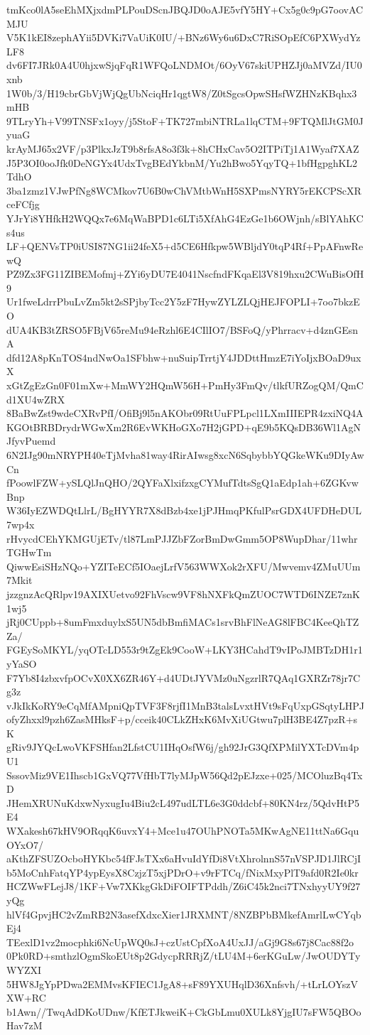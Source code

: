 tmKco0lA5seEhMXjxdmPLPouDScnJBQJD0oAJE5vfY5HY+Cx5g0c9pG7oovACMJU
V5K1kEI8zephAYii5DVKi7VaUiK0IU/+BNz6Wy6u6DxC7RiSOpEfC6PXWydYzLF8
dv6FI7JRk0A4U0hjxwSjqFqR1WFQoLNDMOt/6OyV67skiUPHZJj0aMVZd/IU0xnb
1W0b/3/H19cbrGbVjWjQgUbNciqHr1qgtW8/Z0tSgcsOpwSHsfWZHNzKBqhx3mHB
9TLryYh+V99TNSFx1oyy/j5StoF+TK727mbiNTRLa1lqCTM+9FTQMlJtGM0JyuaG
krAyMJ65x2VF/p3PlkxJzT9b8rfsA8o3f3k+8hCHxCav5O2ITPiTj1A1Wyaf7XAZ
J5P3OI0ooJfk0DeNGYx4UdxTvgBEdYkbnM/Yu2hBwo5YqyTQ+1bfHgpghKL2TdhO
3ba1zmz1VJwPfNg8WCMkov7U6B0wChVMtbWnH5SXPmsNYRY5rEKCPScXRceFCfjg
YJrYi8YHfkH2WQQx7e6MqWaBPD1c6LTi5XfAhG4EzGe1b6OWjnh/sBlYAhKCs4us
LF+QENVsTP0iUSI87NG1ii24feX5+d5CE6Hfkpw5WBljdY0tqP4Rf+PpAFnwRewQ
PZ9Zx3FG11ZIBEMofmj+ZYi6yDU7E4041NscfndFKqaEl3V819hxu2CWuBisOfH9
Ur1fweLdrrPbuLvZm5kt2sSPjbyTcc2Y5zF7HywZYLZLQjHEJFOPLI+7oo7bkzEO
dUA4KB3tZRSO5FBjV65reMu94eRzhl6E4CIlIO7/BSFoQ/yPhrracv+d4znGEsnA
dfd12A8pKnTOS4ndNwOa1SFbhw+nuSuipTrrtjY4JDDttHmzE7iYoIjxBOaD9uxX
xGtZgEzGn0F01mXw+MmWY2HQmW56H+PmHy3FmQv/tlkfURZogQM/QmCd1XU4wZRX
8BaBwZst9wdeCXRvPfI/OfiBj9l5nAKObr09RtUuFPLpcl1LXmIIIEPR4zxiNQ4A
KGOtBRBDrydrWGwXm2R6EvWKHoGXo7H2jGPD+qE9b5KQsDB36Wl1AgNJfyvPuemd
6N2IJg90mNRYPH40eTjMvha81way4RirAIwsg8xcN6SqbybbYQGkeWKu9DIyAwCn
fPoowlFZW+ySLQlJnQHO/2QYFaXlxifzxgCYMufTdtsSgQ1aEdp1ah+6ZGKvwBnp
W36IyEZWDQtLlrL/BgHYYR7X8dBzb4xe1jPJHmqPKfulPsrGDX4UFDHeDUL7wp4x
rHvycdCEhYKMGUjETv/tl87LmPJJZbFZorBmDwGmm5OP8WupDhar/11whrTGHwTm
QiwwEsiSHzNQo+YZITeECf5IOaejLrfV563WWXok2rXFU/Mwvemv4ZMuUUm7Mkit
jzzgnzAcQRlpv19AXIXUetvo92FhVscw9VF8hNXFkQmZUOC7WTD6INZE7znK1wj5
jRj0CUppb+8umFmxduylxS5UN5dbBmfiMACs1srvBhFlNeAG8lFBC4KeeQhTZZa/
FGEySoMKYL/yqOTcLD553r9tZgEk9CooW+LKY3HCahdT9vIPoJMBTzDH1r1yYaSO
F7Yb8I4zbxvfpOCvX0XX6ZR46Y+d4UDtJYVMz0uNgzrlR7QAq1GXRZr78jr7Cg3z
vJkIkKoRY9eCqMfAMpniQpTVF3F8rjfI1MnB3talsLvxtHVt9sFqUxpGSqtyLHPJ
ofyZhxxl9pzh6ZasMHksF+p/cceik40CLkZHxK6MvXiUGtwu7plH3BE4Z7pzR+sK
gRiv9JYQcLwoVKFSHfan2LfstCU1IHqOsfW6j/gh92JrG3QfXPMilYXTcDVm4pU1
SssovMiz9VE1Ihscb1GxVQ77VfHbT7lyMJpW56Qd2pEJzxe+025/MCOluzBq4TxD
JHemXRUNuKdxwNyxugIu4Biu2cL497udLTL6e3G0ddcbf+80KN4rz/5QdvHtP5E4
WXakesh67kHV9ORqqK6uvxY4+Mce1u47OUhPNOTa5MKwAgNE11ttNa6GquOYxO7/
aKthZFSUZOcboHYKbc54fFJsTXx6aHvuIdYfDi8VtXhrolnnS57nVSPJD1JlRCjI
b5MoCnhFatqYP4ypEysX8CzjzT5xjPDrO+v9rFTCq/fNixMxyPlT9afd0R2Ie0kr
HCZWwFLejJ8/1KF+Vw7XKkgGkDiFOIFTPddh/Z6iC45k2nci7TNxhyyUY9f27yQg
hlVf4GpvjHC2vZmRB2N3asefXdxcXier1JRXMNT/8NZBPbBMkefAmrlLwCYqbEj4
TEexlD1vz2mocphki6NcUpWQ0sJ+czUstCpfXoA4UxJJ/aGj9G8s67j8Cac88f2o
0Pk0RD+smthzlOgmSkoEUt8p2GdycpRRRjZ/tLU4M+6erKGuLw/JwOUDYTyWYZXI
5HW8JgYpPDwa2EMMvsKFIEC1JgA8+sF89YXUHqlD36Xnfsvh/+tLrLOYszVXW+RC
b1Awn//TwqAdDKoUDnw/KfETJkweiK+CkGbLmu0XULk8YjgIU7sFW5QBOoHav7zM
